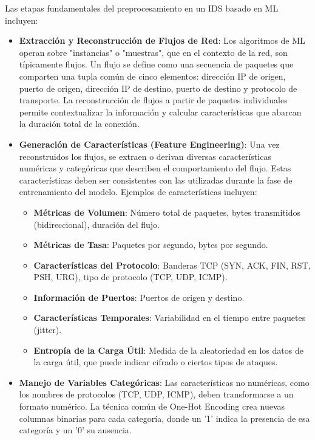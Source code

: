 Las etapas fundamentales del preprocesamiento en un IDS basado en ML incluyen:
\begin{itemize}
   
    \item\textbf{Extracción y Reconstrucción de Flujos de Red}: Los algoritmos de ML operan sobre "instancias" o "muestras", que en el contexto de la red, son típicamente flujos. Un flujo se define como una secuencia de paquetes que comparten una tupla común de cinco elementos: dirección IP de origen, puerto de origen, dirección IP de destino, puerto de destino y protocolo de transporte. La reconstrucción de flujos a partir de paquetes individuales permite contextualizar la información y calcular características que abarcan la duración total de la conexión.
    
     \item\textbf{Generación de Características (Feature Engineering)}: Una vez reconstruidos los flujos, se extraen o derivan diversas características numéricas y categóricas que describen el comportamiento del flujo. Estas características deben ser consistentes con las utilizadas durante la fase de entrenamiento del modelo. Ejemplos de características incluyen:
    \begin{itemize}
         \item\textbf{Métricas de Volumen}: Número total de paquetes, bytes transmitidos (bidireccional), duración del flujo.
        
         \item\textbf{Métricas de Tasa}: Paquetes por segundo, bytes por segundo.
        
         \item\textbf{Características del Protocolo}: Banderas TCP (SYN, ACK, FIN, RST, PSH, URG), tipo de protocolo (TCP, UDP, ICMP).
        
         \item\textbf{Información de Puertos}: Puertos de origen y destino.
        
         \item\textbf{Características Temporales}: Variabilidad en el tiempo entre paquetes (jitter).
        
         \item\textbf{Entropía de la Carga Útil}: Medida de la aleatoriedad en los datos de la carga útil, que puede indicar cifrado o ciertos tipos de ataques.
    \end{itemize}
    
     \item\textbf{Manejo de Variables Categóricas}: Las características no numéricas, como los nombres de protocolos (TCP, UDP, ICMP), deben transformarse a un formato numérico. La técnica común de One-Hot Encoding crea nuevas columnas binarias para cada categoría, donde un '1' indica la presencia de esa categoría y un '0' su ausencia.
    

\end{itemize}

